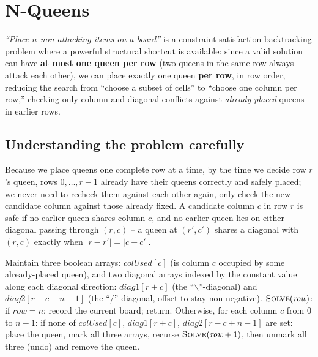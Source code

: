 \section{N-Queens}
\label{sec:rec-n-queens}


\begin{patternbox}
\emph{``Place $n$ non-attacking items on a board''} is a constraint-satisfaction
backtracking problem where a powerful structural shortcut is available:
since a valid solution can have \textbf{at most one queen per row}
(two queens in the same row always attack each other), we can place
exactly one queen \textbf{per row}, in row order, reducing the search
from ``choose a subset of cells'' to ``choose one column per row,''
checking only column and diagonal conflicts against \emph{already-placed}
queens in earlier rows.
\end{patternbox}

\subsection*{Understanding the problem carefully}

Because we place queens one complete row at a time, by the time we
decide row $r$'s queen, rows $0, \dots, r-1$ already have their queens
correctly and safely placed; we never need to recheck them against each
other again, only check the new candidate column against those already
fixed. A candidate column $c$ in row $r$ is safe if no earlier queen
shares column $c$, and no earlier queen lies on either diagonal passing
through $(r,c)$ -- a queen at $(r', c')$ shares a diagonal with $(r,c)$
exactly when $|r-r'| = |c-c'|$.

\begin{ideabox}
Maintain three boolean arrays: $\textit{colUsed}[c]$ (is column $c$
occupied by some already-placed queen), and two diagonal arrays indexed
by the constant value along each diagonal direction:
$\textit{diag1}[r+c]$ (the ``$\backslash$''-diagonal) and
$\textit{diag2}[r-c+n-1]$ (the ``$/$''-diagonal, offset to stay
non-negative). $\textsc{Solve}(\textit{row})$: if $\textit{row}=n$:
record the current board; return. Otherwise, for each column $c$ from
$0$ to $n-1$: if none of $\textit{colUsed}[c]$, $\textit{diag1}[r+c]$,
$\textit{diag2}[r-c+n-1]$ are set: place the queen, mark all three
arrays, recurse $\textsc{Solve}(\textit{row}+1)$, then unmark all three
(undo) and remove the queen.
\end{ideabox}

